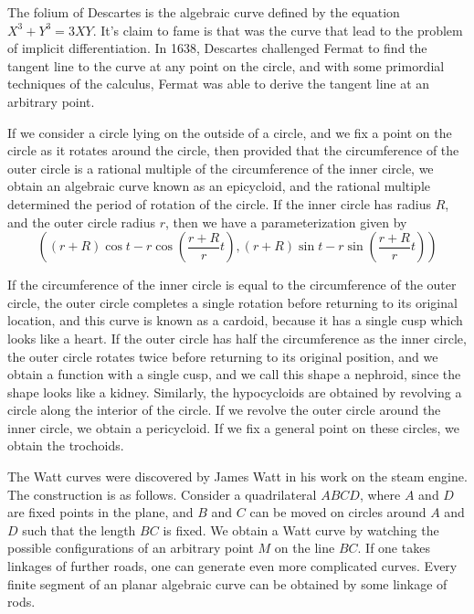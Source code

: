 \begin{example}
    The folium of Descartes is the algebraic curve defined by the equation $X^3 + Y^3 = 3XY$. It's claim to fame is that was the curve that lead to the problem of implicit differentiation. In 1638, Descartes challenged Fermat to find the tangent line to the curve at any point on the circle, and with some primordial techniques of the calculus, Fermat was able to derive the tangent line at an arbitrary point.
\end{example}

\begin{example}
    If we consider a circle lying on the outside of a circle, and we fix a point on the circle as it rotates around the circle, then provided that the circumference of the outer circle is a rational multiple of the circumference of the inner circle, we obtain an algebraic curve known as an epicycloid, and the rational multiple determined the period of rotation of the circle. If the inner circle has radius $R$, and the outer circle radius $r$, then we have a parameterization given by
    \[ \left( (r + R) \cos t - r \cos \left(\frac{r + R}{r}t \right), (r + R) \sin t - r \sin \left( \frac{r + R}{r}t \right) \right) \]



    If the circumference of the inner circle is equal to the circumference of the outer circle, the outer circle completes a single rotation before returning to its original location, and this curve is known as a cardoid, because it has a single cusp which looks like a heart. If the outer circle has half the circumference as the inner circle, the outer circle rotates twice before returning to its original position, and we obtain a function with a single cusp, and we call this shape a nephroid, since the shape looks like a kidney. Similarly, the hypocycloids are obtained by revolving a circle along the interior of the circle. If we revolve the outer circle around the inner circle, we obtain a pericycloid. If we fix a general point on these circles, we obtain the trochoids.
\end{example}

\begin{example}
    The Watt curves were discovered by James Watt in his work on the steam engine. The construction is as follows. Consider a quadrilateral $ABCD$, where $A$ and $D$ are fixed points in the plane, and $B$ and $C$ can be moved on circles around $A$ and $D$ such that the length $BC$ is fixed. We obtain a Watt curve by watching the possible configurations of an arbitrary point $M$ on the line $BC$. If one takes linkages of further roads, one can generate even more complicated curves. Every finite segment of an planar algebraic curve can be obtained by some linkage of rods.
\end{example}

